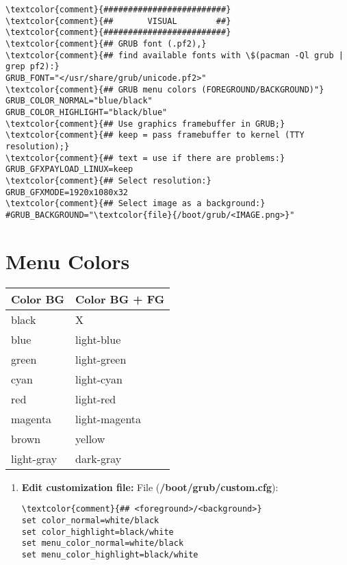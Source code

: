 \documentclass[10pt, a4paper, onecolumn, openany]{book} %
\begin{document}
\begin{enumerate}
\begin{Verbatim}[commandchars=\\\{\}]
\textcolor{comment}{#########################}
\textcolor{comment}{##       VISUAL        ##}
\textcolor{comment}{#########################}
\textcolor{comment}{## GRUB font (.pf2),}
\textcolor{comment}{## find available fonts with \$(pacman -Ql grub | grep pf2):}
GRUB_FONT="</usr/share/grub/unicode.pf2>"
\textcolor{comment}{## GRUB menu colors (FOREGROUND/BACKGROUND)"}
GRUB_COLOR_NORMAL="blue/black"
GRUB_COLOR_HIGHLIGHT="black/blue"
\textcolor{comment}{## Use graphics framebuffer in GRUB;}
\textcolor{comment}{## keep = pass framebuffer to kernel (TTY resolution);}
\textcolor{comment}{## text = use if there are problems:}
GRUB_GFXPAYLOAD_LINUX=keep
\textcolor{comment}{## Select resolution:}
GRUB_GFXMODE=1920x1080x32
\textcolor{comment}{## Select image as a background:}
#GRUB_BACKGROUND="\textcolor{file}{/boot/grub/<IMAGE.png>}"
\end{Verbatim}
\end{enumerate}
\section{Menu Colors}
\begin{center}
    \begin{small}
    \begin{tabular}{|p{4cm}|p{4cm}|}
    \hline
    \textbf{Color BG} & \textbf{Color BG + FG} \\
    \hline
    black & X \\
    \hline
    blue & light-blue \\
    \hline
    green & light-green \\
    \hline
    cyan & light-cyan \\
    \hline
    red & light-red \\
    \hline
    magenta & light-magenta \\
    \hline
    brown & yellow \\
    \hline
    light-gray & dark-gray  \\
    \hline
    \end{tabular}
    \end{small}
\end{center}
\begin{enumerate}
    \item \textbf{Edit customization file:}
\newline File (\textbf{\textcolor{file}{/boot/grub/custom.cfg}}):
\begin{Verbatim}[commandchars=\\\{\}]
\textcolor{comment}{## <foreground>/<background>}
set color_normal=white/black
set color_highlight=black/white
set menu_color_normal=white/black
set menu_color_highlight=black/white
\end{Verbatim}
\end{enumerate}
\end{document}
